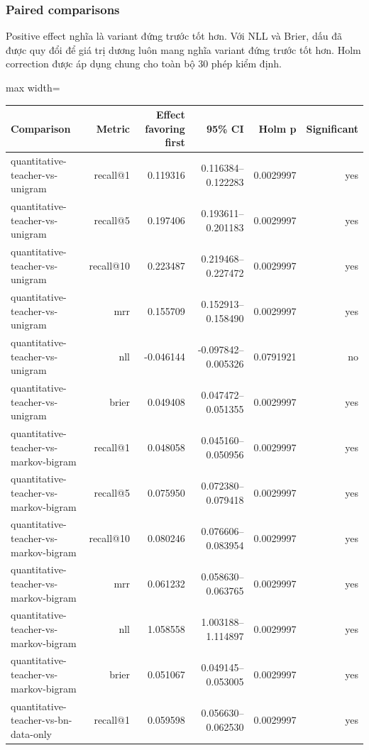 \subsubsection*{Paired comparisons}

Positive effect nghĩa là variant đứng trước tốt hơn. Với NLL và Brier, dấu đã được quy đổi để giá trị dương luôn mang nghĩa variant đứng trước tốt hơn. Holm correction được áp dụng chung cho toàn bộ 30 phép kiểm định.

\begin{table}[!htbp]
\centering
\scriptsize
\setlength{\tabcolsep}{2.5pt}
\begin{adjustbox}{max width=\textwidth}
\begin{tabular}{@{}lrrrrr@{}}
\toprule
Comparison & Metric & Effect favoring first & 95\% CI & Holm p & Significant \\
\midrule
quantitative-teacher-vs-unigram & recall@1 & 0.119316 & 0.116384--0.122283 & 0.0029997 & yes \\
quantitative-teacher-vs-unigram & recall@5 & 0.197406 & 0.193611--0.201183 & 0.0029997 & yes \\
quantitative-teacher-vs-unigram & recall@10 & 0.223487 & 0.219468--0.227472 & 0.0029997 & yes \\
quantitative-teacher-vs-unigram & mrr & 0.155709 & 0.152913--0.158490 & 0.0029997 & yes \\
quantitative-teacher-vs-unigram & nll & -0.046144 & -0.097842--0.005326 & 0.0791921 & no \\
quantitative-teacher-vs-unigram & brier & 0.049408 & 0.047472--0.051355 & 0.0029997 & yes \\
quantitative-teacher-vs-markov-bigram & recall@1 & 0.048058 & 0.045160--0.050956 & 0.0029997 & yes \\
quantitative-teacher-vs-markov-bigram & recall@5 & 0.075950 & 0.072380--0.079418 & 0.0029997 & yes \\
quantitative-teacher-vs-markov-bigram & recall@10 & 0.080246 & 0.076606--0.083954 & 0.0029997 & yes \\
quantitative-teacher-vs-markov-bigram & mrr & 0.061232 & 0.058630--0.063765 & 0.0029997 & yes \\
quantitative-teacher-vs-markov-bigram & nll & 1.058558 & 1.003188--1.114897 & 0.0029997 & yes \\
quantitative-teacher-vs-markov-bigram & brier & 0.051067 & 0.049145--0.053005 & 0.0029997 & yes \\
quantitative-teacher-vs-bn-data-only & recall@1 & 0.059598 & 0.056630--0.062530 & 0.0029997 & yes \\

\end{tabular}
\end{adjustbox}
\end{table}
